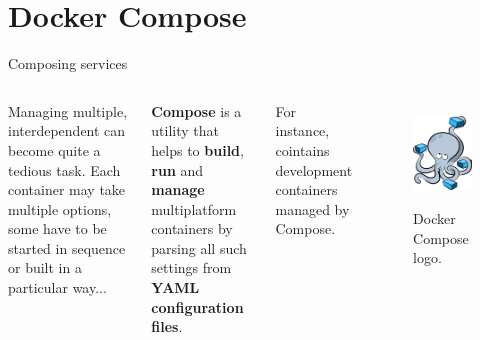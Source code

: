 
\section{Docker Compose}
\graphicspath{{figs/section3/}}

\begin{frame}{Composing services}
	\begin{columns}
		Managing multiple, interdependent  can become quite a tedious task.
    \newline\newline
		Each container may take multiple options, some have to be started in sequence or built in a particular way...
		\begin{block}{}
			\centering
			\textbf{Compose} is a utility that helps to \textbf{build}, \textbf{run} and \textbf{manage} multiplatform containers by parsing all such settings from \textbf{YAML configuration files}.
		\end{block}
    For instance,  cointains development containers managed by Compose.

		\begin{figure}
			\centering
			\includegraphics[scale=.25]{composeLogo.png}
			\label{fig:compose}
			\caption{Docker Compose logo.}
		\end{figure}
	\end{columns}
\end{frame}

